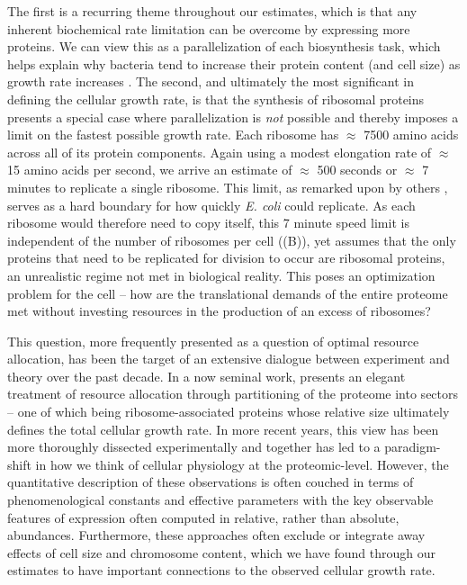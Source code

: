 The first is a recurring theme throughout our estimates, which is that any
inherent biochemical rate limitation can be overcome by expressing more
proteins. We can view this as a parallelization of each biosynthesis task,
which helps explain why bacteria tend to increase their protein content (and
cell size) as growth rate increases \citep{ojkic2019}. The second, and
ultimately the most significant in defining the cellular growth rate, is that
the synthesis of ribosomal proteins presents a special case where
parallelization is \textit{not} possible and thereby imposes a limit on the
fastest possible growth rate. Each ribosome has $\approx$ 7500 amino acids
across all of its protein components. Again using a modest elongation rate of
$\approx$ 15 amino acids per second, we arrive an estimate of $\approx$ 500
seconds or $\approx$ 7 minutes to replicate a single ribosome. This limit, as remarked upon by others
\citep{dill2011}, serves as a hard boundary for how quickly \textit{E. coli}
could replicate. As each ribosome would therefore need to copy itself, this 7
minute speed limit is independent of the number of ribosomes per cell
((B)), yet assumes that the only proteins that need to be
replicated for division to occur are ribosomal proteins, an unrealistic regime
not met in biological reality. This poses an optimization problem for the
cell -- how are the translational demands of the entire proteome met without
investing resources in the production of an excess of ribosomes?

This question, more frequently presented as a question of optimal resource
allocation, has been the target of an extensive dialogue between experiment and
theory over the past decade. In a now seminal work,
\cite{scott2010} presents an elegant treatment of resource allocation through
partitioning of the proteome into sectors -- one of which being
ribosome-associated proteins whose relative size ultimately defines
the total cellular growth rate. In more recent years, this view has been more
thoroughly dissected experimentally
\citep{klumpp2014,basan2015,dai2018, dai2016, erickson2017} and together
has led to a paradigm-shift in how we think of cellular physiology at the
proteomic-level. However, the quantitative description of these  observations is
often couched in terms of phenomenological constants and effective parameters
with the key observable features of expression often computed in relative, rather
than absolute, abundances. Furthermore, these approaches often exclude or
integrate away effects of cell size and chromosome content, which we have
found through our estimates to have important connections to the observed cellular
growth rate.

